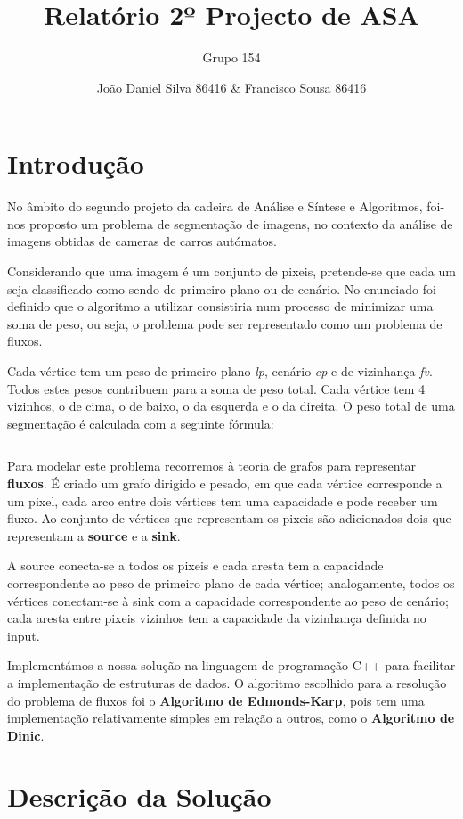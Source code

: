 \documentclass[12pt,a4paper]{article}
\author{Grupo 154 \and João Daniel Silva 86416 \& Francisco Sousa 86416}
\title{Relatório 2º Projecto de ASA}
\begin{document}
\maketitle

\section{Introdução}
No âmbito do segundo projeto da cadeira de Análise e Síntese e Algoritmos, foi-nos proposto um problema de segmentação de imagens,
no contexto da análise de imagens obtidas de cameras de carros autómatos.

Considerando que uma imagem é um conjunto de pixeis, pretende-se que cada um seja classificado como sendo de primeiro plano ou de
cenário. No enunciado foi definido que o algoritmo a utilizar consistiria num processo de minimizar uma soma de peso, ou seja, o
problema pode ser representado como um problema de fluxos.

Cada vértice tem um peso de primeiro plano \textit{lp}, cenário \textit{cp} e de
vizinhança \textit{fv}. Todos estes pesos contribuem para a soma de peso total. Cada vértice tem 4 vizinhos, o de cima, o de baixo, o
da esquerda e o da direita. O peso total de uma segmentação é calculada com a seguinte fórmula:

$$ $$

Para modelar este problema recorremos à teoria de grafos para representar \textbf{fluxos}. É criado um grafo dirigido e pesado, em que cada
vértice corresponde a um pixel, cada arco entre dois vértices tem uma capacidade e pode receber um fluxo. Ao conjunto de vértices
que representam os pixeis são adicionados dois que representam a \textbf{source} e a \textbf{sink}.

A source conecta-se a todos os pixeis e cada
aresta tem a capacidade correspondente ao peso de primeiro plano de cada vértice; analogamente, todos os vértices conectam-se
à sink com a capacidade correspondente ao peso de cenário; cada aresta entre pixeis vizinhos tem a capacidade da vizinhança
definida no input.

Implementámos a nossa solução na linguagem de programação C++ para facilitar a implementação de estruturas de dados. O
algoritmo escolhido para a resolução do problema de fluxos foi o \textbf{Algoritmo de Edmonds-Karp}, pois tem uma implementação relativamente
simples em relação a outros, como o \textbf{Algoritmo de Dinic}.

\section{Descrição da Solução}
\end{document}
